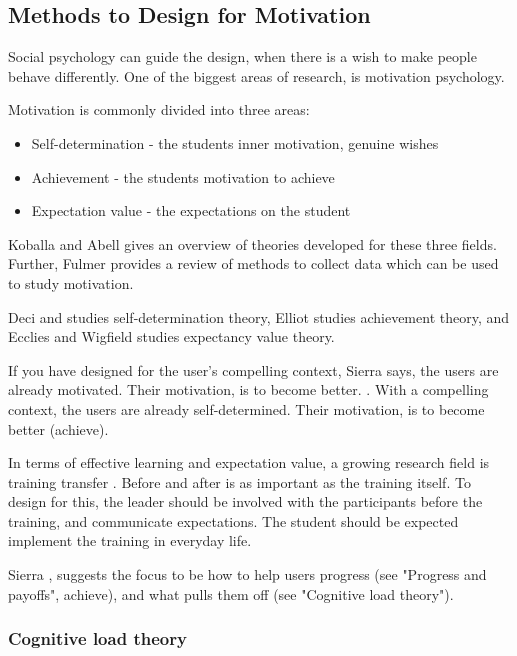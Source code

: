 \subsection{Methods to Design for Motivation}

Social psychology can guide the design, when there is a wish to make people behave differently. One of the biggest areas of research, is motivation psychology.

Motivation is commonly divided into three areas:
\begin{itemize}
\item Self-determination - the students inner motivation, genuine wishes
\item Achievement - the students motivation to achieve
\item Expectation value - the expectations on the student
\end{itemize}

Koballa \cite{koballa} and Abell \cite{goballa} gives an overview of theories developed for these three fields. Further, Fulmer \cite{fulmer} provides a review of methods to collect data which can be used to study motivation.

Deci \cite{deci} and \cite{ryan} studies self-determination theory, Elliot \cite{elliot} studies achievement theory, and Ecclies \cite{eccles} and Wigfield \cite{wigfield} studies expectancy value theory.

If you have designed for the user's compelling context, Sierra says, the users are already motivated. Their motivation, is to become better. \cite{sierra}.
With a compelling context, the users are already self-determined. Their motivation, is to become better (achieve).

In terms of effective learning and expectation value, a growing research field is training transfer \cite{brinkerhoff}. Before and after is as important as the training itself. To design for this, the leader should be involved with the participants before the training, and communicate expectations. The student should be expected implement the training in everyday life. \cite{brinkerhoff}

Sierra \cite{sierra}, suggests the focus to be how to help users progress (see "Progress and payoffs", achieve), and what pulls them off (see "Cognitive load theory").

\subsubsection{Cognitive load theory}

